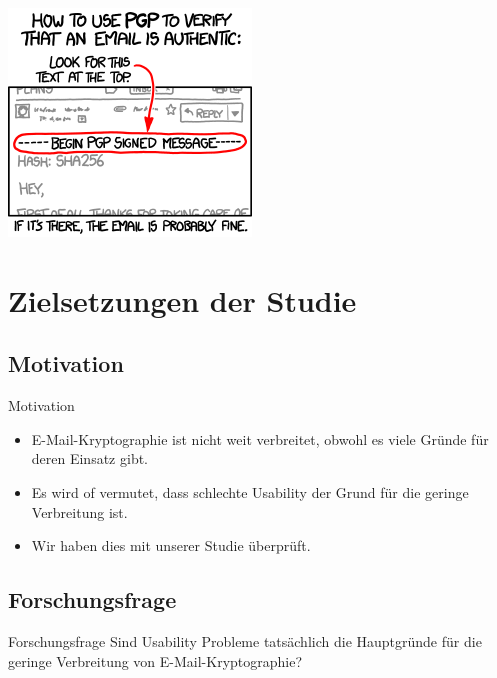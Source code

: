 \documentclass[]{beamer}
\begin{document}
\begin{frame}[plain]
	\begin{center}
		\includegraphics[scale=0.7]{pic/pgp.png}
	\end{center}
\end{frame}

\begin{frame}[plain]
	\titlepage
\end{frame}


\section{Zielsetzungen der Studie}

\subsection{Motivation}
\begin{frame}{Motivation}
\begin{itemize}
	\item E-Mail-Kryptographie ist nicht weit verbreitet, obwohl es viele Gründe für deren Einsatz gibt.
	\item Es wird of vermutet, dass schlechte Usability der Grund für die geringe Verbreitung ist.
	\item Wir haben dies mit unserer Studie überprüft.
\end{itemize}
\end{frame}


\subsection{Forschungsfrage}
\begin{frame}{Forschungsfrage}
	Sind Usability Probleme tatsächlich die Hauptgründe für die geringe Verbreitung von E-Mail-Kryptographie?

	\vspace{1.2cm}
\end{frame}
\end{document}
